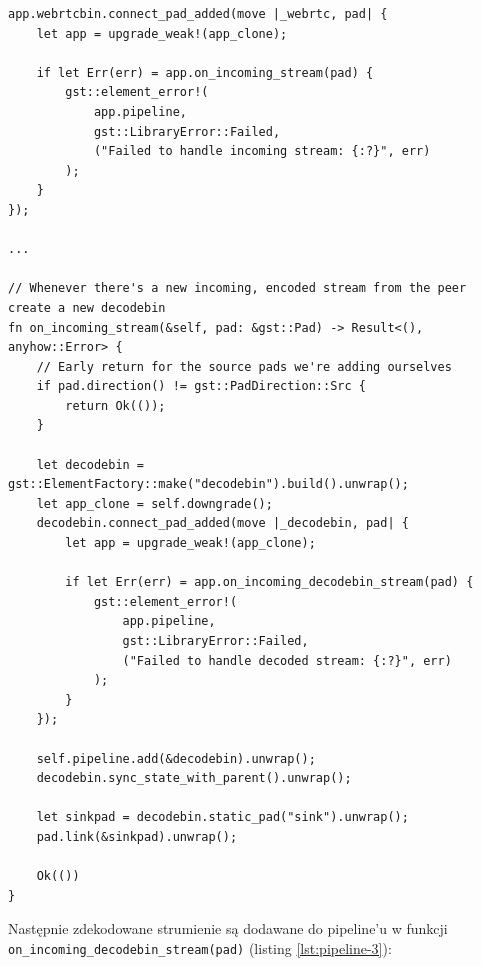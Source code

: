 \begin{verbatim}
app.webrtcbin.connect_pad_added(move |_webrtc, pad| {
    let app = upgrade_weak!(app_clone);

    if let Err(err) = app.on_incoming_stream(pad) {
        gst::element_error!(
            app.pipeline,
            gst::LibraryError::Failed,
            ("Failed to handle incoming stream: {:?}", err)
        );
    }
});

...

// Whenever there's a new incoming, encoded stream from the peer create a new decodebin
fn on_incoming_stream(&self, pad: &gst::Pad) -> Result<(), anyhow::Error> {
    // Early return for the source pads we're adding ourselves
    if pad.direction() != gst::PadDirection::Src {
        return Ok(());
    }

    let decodebin = gst::ElementFactory::make("decodebin").build().unwrap();
    let app_clone = self.downgrade();
    decodebin.connect_pad_added(move |_decodebin, pad| {
        let app = upgrade_weak!(app_clone);

        if let Err(err) = app.on_incoming_decodebin_stream(pad) {
            gst::element_error!(
                app.pipeline,
                gst::LibraryError::Failed,
                ("Failed to handle decoded stream: {:?}", err)
            );
        }
    });

    self.pipeline.add(&decodebin).unwrap();
    decodebin.sync_state_with_parent().unwrap();

    let sinkpad = decodebin.static_pad("sink").unwrap();
    pad.link(&sinkpad).unwrap();

    Ok(())
}
\end{verbatim}

Następnie zdekodowane strumienie są dodawane do pipeline'u w funkcji
\verb|on_incoming_decodebin_stream(pad)| (listing \ref{lst:pipeline-3}):

